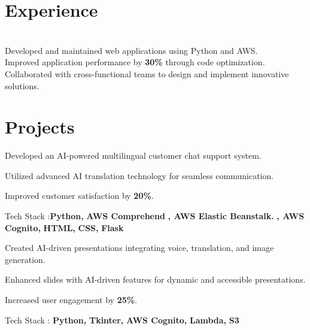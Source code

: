 \documentclass[]{deedy-resume-openfont}
\begin{document}
\begin{minipage}[t]{0.66\textwidth} 


\section{Experience}
 \\
\textbullet{} Developed and maintained web applications using Python and AWS.\\
\textbullet{} Improved application performance by \textbf{30\%} through code optimization.\\
\textbullet{} Collaborated with cross-functional teams to design and implement innovative 
   solutions.\\
\sectionsep

\section{Projects}
\vspace{\topsep} %
\begin{tightemize}
\item Developed an AI-powered multilingual customer chat support system.
\item Utilized advanced AI translation technology for seamless communication.
\item  Improved customer satisfaction by \textbf{20\%}.
\item Tech Stack :\textbf{Python, } \textbf{AWS Comprehend} \textbf{, AWS Elastic Beanstalk.} \textbf{, AWS Cognito, }\textbf{HTML, }\textbf{CSS, } \textbf{Flask}
\end{tightemize}
\sectionsep

\vspace{\topsep} %
\begin{tightemize}
\item Created AI-driven presentations integrating voice, translation, and image generation. 
\item Enhanced slides with AI-driven features for dynamic and accessible presentations.
\item Increased user engagement by \textbf{25\%}.
\item Tech Stack : \textbf{Python, } \textbf{Tkinter, } \textbf{AWS Cognito, } \textbf{Lambda, } \textbf{S3}
\end{tightemize}
\sectionsep


\end{minipage}
\end{document}
